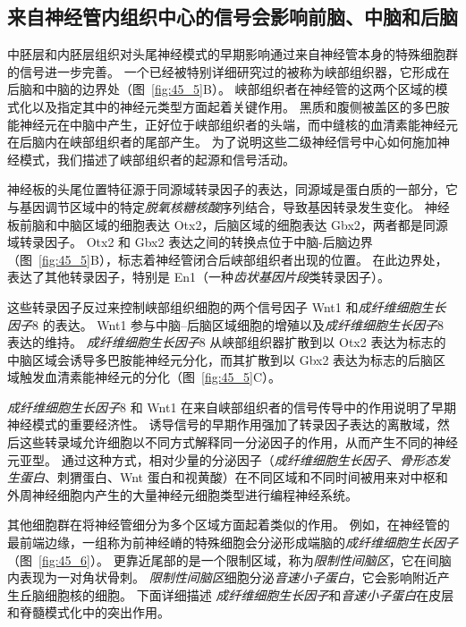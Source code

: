 \subsection{来自神经管内组织中心的信号会影响前脑、中脑和后脑}

中胚层和内胚层组织对头尾神经模式的早期影响通过来自神经管本身的特殊细胞群的信号进一步完善。
一个已经被特别详细研究过的被称为峡部组织器，它形成在后脑和中脑的边界处（图~\ref{fig:45_5}B）。
峡部组织者在神经管的这两个区域的模式化以及指定其中的神经元类型方面起着关键作用。
黑质和腹侧被盖区的多巴胺能神经元在中脑中产生，正好位于峡部组织者的头端，而中缝核的血清素能神经元在后脑内在峡部组织者的尾部产生。
为了说明这些二级神经信号中心如何施加神经模式，我们描述了峡部组织者的起源和信号活动。


神经板的头尾位置特征源于同源域转录因子的表达，同源域是蛋白质的一部分，它与基因调节区域中的特定\textit{脱氧核糖核酸}序列结合，导致基因转录发生变化。
神经板前脑和中脑区域的细胞表达 Otx2，后脑区域的细胞表达 Gbx2，两者都是同源域转录因子。
Otx2 和 Gbx2 表达之间的转换点位于中脑-后脑边界（图~\ref{fig:45_5}B），标志着神经管闭合后峡部组织者出现的位置。
在此边界处，表达了其他转录因子，特别是 En1（一种\textit{齿状基因片段}类转录因子）。


这些转录因子反过来控制峡部组织细胞的两个信号因子 Wnt1 和\textit{成纤维细胞生长因子}8 的表达。
Wnt1 参与中脑--后脑区域细胞的增殖以及\textit{成纤维细胞生长因子}8 表达的维持。
\textit{成纤维细胞生长因子}8 从峡部组织器扩散到以 Otx2 表达为标志的中脑区域会诱导多巴胺能神经元分化，而其扩散到以 Gbx2 表达为标志的后脑区域触发血清素能神经元的分化（图~\ref{fig:45_5}C）。


\textit{成纤维细胞生长因子}8 和 Wnt1 在来自峡部组织者的信号传导中的作用说明了早期神经模式的重要经济性。
诱导信号的早期作用强加了转录因子表达的离散域，然后这些转录域允许细胞以不同方式解释同一分泌因子的作用，从而产生不同的神经元亚型。
通过这种方式，相对少量的分泌因子（\textit{成纤维细胞生长因子}、\textit{骨形态发生蛋白}、刺猬蛋白、Wnt 蛋白和视黄酸）在不同区域和不同时间被用来对中枢和外周神经细胞内产生的大量神经元细胞类型进行编程神经系统。


其他细胞群在将神经管细分为多个区域方面起着类似的作用。
例如，在神经管的最前端边缘，一组称为前神经嵴的特殊细胞会分泌形成端脑的\textit{成纤维细胞生长因子}（图~\ref{fig:45_6}）。
更靠近尾部的是一个限制区域，称为\textit{限制性间脑区}，它在间脑内表现为一对角状骨刺。
\textit{限制性间脑区}细胞分泌\textit{音速小子蛋白}，它会影响附近产生丘脑细胞核的细胞。
下面详细描述 \textit{成纤维细胞生长因子}和\textit{音速小子蛋白}在皮层和脊髓模式化中的突出作用。



